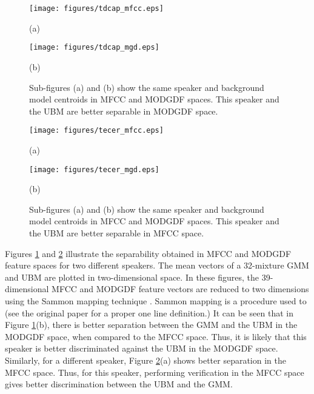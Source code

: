 \documentclass{article}
\begin{document}
\begin{figure}[h]
\centering 
\begin{minipage}[c]{0.5\textwidth}
\centering 
    \texttt{[image: figures/tdcap\_mfcc.eps]}
	\caption*{(a)}
\end{minipage}%
\begin{minipage}[c]{0.35\textwidth}
\centering  
    \texttt{[image: figures/tdcap\_mgd.eps]}
	\caption*{(b)}
\end{minipage}
\caption{Sub-figures (a) and (b) show the same speaker and background model
centroids in MFCC and MODGDF spaces. This speaker and the UBM are better
separable in MODGDF space.}
\label{fig:ubm_sep1}
\end{figure}

\begin{figure}[h]
\centering 
\begin{minipage}[c]{0.45\textwidth}
\centering 
    \texttt{[image: figures/tecer\_mfcc.eps]}
	\caption*{(a)}
\end{minipage}%
\begin{minipage}[c]{0.45\textwidth}
\centering  
    \texttt{[image: figures/tecer\_mgd.eps]}
	\caption*{(b)}
\end{minipage}
\caption{Sub-figures (a) and (b) show the same speaker and background model
centroids in MFCC and MODGDF spaces. This speaker and the UBM are better
separable in MFCC space.}
\label{fig:ubm_sep2}
\end{figure}

Figures \ref{fig:ubm_sep1} and \ref{fig:ubm_sep2} illustrate the
separability obtained in MFCC and MODGDF feature spaces for two different
speakers. The mean vectors of a 32-mixture GMM and UBM are plotted in
two-dimensional space. In these figures, the 39-dimensional MFCC and MODGDF
feature vectors are reduced to two dimensions using the Sammon mapping technique
\cite{sammon}. Sammon mapping is a procedure used to (see the original paper for
a proper one line definition.)
It can be seen that in Figure \ref{fig:ubm_sep1}(b), there is
better separation between the GMM and the UBM in the MODGDF space, when compared
to the MFCC space. Thus, it is likely that this speaker is better discriminated
against the UBM in the MODGDF space. Similarly, for a different speaker, 
Figure \ref{fig:ubm_sep2}(a) shows better separation in the MFCC space. Thus,
for this speaker, performing verification in the MFCC space gives better
discrimination between the UBM and the GMM. 
\end{document}
